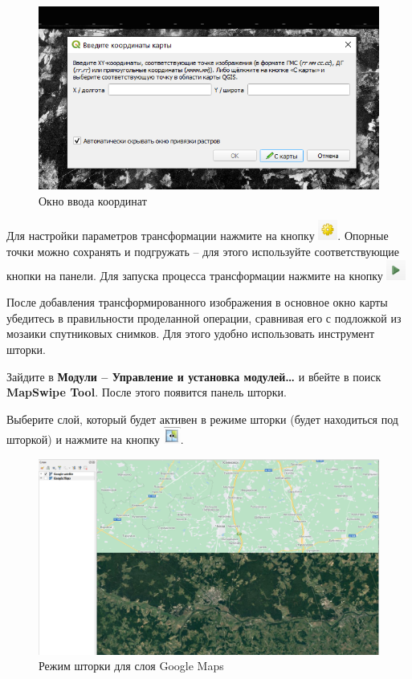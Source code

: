 \documentclass[
  12pt,
]{book}
\begin{document}
\begin{figure}
\centering
\includegraphics{images/Ref02/Input_coordinates.png}
\caption{Окно ввода координат}
\end{figure}

Для настройки параметров трансформации нажмите на кнопку \includegraphics{images/Ref02/Transformation_settings.png}. Опорные точки можно сохранять и подгружать -- для этого используйте соответствующие кнопки на панели. Для запуска процесса трансформации нажмите на кнопку \includegraphics{images/Ref02/Transformation_button.png}

После добавления трансформированного изображения в основное окно карты убедитесь в правильности проделанной операции, сравнивая его с подложкой из мозаики спутниковых снимков. Для этого удобно использовать инструмент шторки.

Зайдите в \textbf{Модули -- Управление и установка модулей\ldots{}} и вбейте в поиск \textbf{MapSwipe Tool}. После этого появится панель шторки.

Выберите слой, который будет активен в режиме шторки (будет находиться под шторкой) и нажмите на кнопку \includegraphics{images/Ref02/Swipe_button.png}.

\begin{figure}
\centering
\includegraphics{images/Ref02/Swipe.png}
\caption{Режим шторки для слоя Google Maps}
\end{figure}
\end{document}
